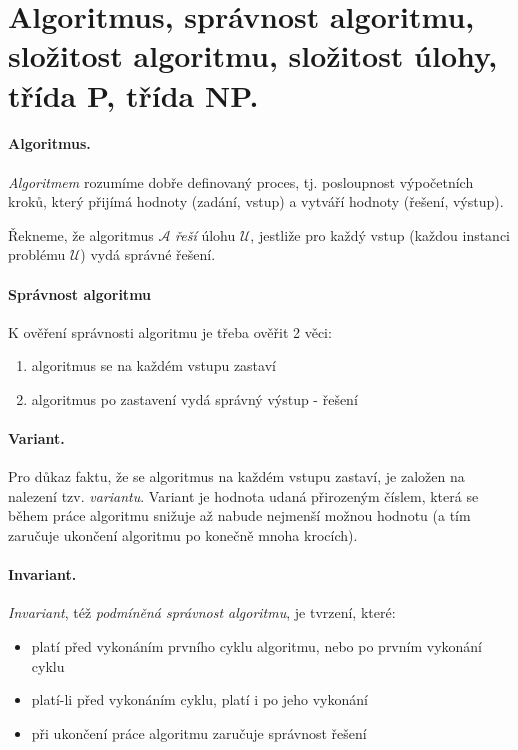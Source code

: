 \section[TAL - Algoritmus, P, NP]{Algoritmus, správnost algoritmu, složitost algoritmu, složitost úlohy, třída P, třída NP.}

\paragraph{Algoritmus.}
\label{algoritmus}
\textit{Algoritmem} rozumíme dobře definovaný proces, tj. posloupnost výpočetních kroků, který přijímá hodnoty (zadání, vstup) a vytváří hodnoty (řešení, výstup).

Řekneme, že algoritmus $\mathcal{A}$ \textit{řeší}  úlohu $\mathcal{U}$, jestliže pro každý vstup (každou instanci problému $\mathcal{U}$) vydá správné řešení.

\paragraph{Správnost algoritmu}
K ověření správnosti algoritmu je třeba ověřit 2 věci:
\begin{enumerate}[itemsep=0pt]
    \item algoritmus se na každém vstupu zastaví
    \item algoritmus po zastavení vydá správný výstup - řešení
\end{enumerate}

\paragraph{Variant.}
Pro důkaz faktu, že se algoritmus na každém vstupu zastaví, je založen na nalezení tzv. \textit{variantu}. Variant je hodnota udaná přirozeným číslem, která se během práce algoritmu snižuje až nabude nejmenší možnou hodnotu (a tím zaručuje ukončení algoritmu po konečně mnoha krocích).

\paragraph{Invariant.}
\textit{Invariant}, též \textit{podmíněná správnost algoritmu}, je tvrzení, které:
\begin{itemize}[itemsep=0pt]
    \item platí před vykonáním prvního cyklu algoritmu, nebo po prvním vykonání cyklu
    \item platí-li před vykonáním cyklu, platí i po jeho vykonání
    \item při ukončení práce algoritmu zaručuje správnost řešení
\end{itemize}

